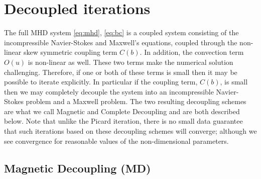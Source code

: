 \section{Decoupled iterations}
\label{sec:FEMdecouple}


The full MHD system \eqref{eq:mhd}, \eqref{eq:bc} is a coupled system consisting of the incompressible Navier-Stokes and Maxwell's equations, coupled through the non-linear skew symmetric coupling term $C(b)$. In addition, the convection term $O(u)$ is non-linear as well. These two terms make the numerical solution challenging. Therefore, if one or both of these terms is small then it may be possible to iterate explicitly. In particular if the coupling term, $C(b)$, is small then we may completely decouple the system into an incompressible Navier-Stokes problem and a Maxwell problem. The two resulting decoupling schemes are what we call Magnetic and Complete Decoupling and are both described below. Note that unlike the Picard iteration, there is no small data guarantee that such iterations based on these decoupling schemes will converge; although we see convergence for reasonable values of the non-dimensional parameters.


\subsection{Magnetic Decoupling (MD)}
\label{sec:FEMmd}

